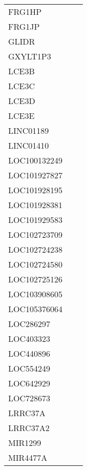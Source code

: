 \begin{tabular}{lcc}
FRG1HP             &           &         \\
FRG1JP             &           &         \\
GLIDR              &           &         \\
GXYLT1P3           &           &         \\
LCE3B              &           &         \\
LCE3C              &           &         \\
LCE3D              &           &         \\
LCE3E              &           &         \\
LINC01189          &           &         \\
LINC01410          &           &         \\
LOC100132249       &           &         \\
LOC101927827       &           &         \\
LOC101928195       &           &         \\
LOC101928381       &           &         \\
LOC101929583       &           &         \\
LOC102723709       &           &         \\
LOC102724238       &           &         \\
LOC102724580       &           &         \\
LOC102725126       &           &         \\
LOC103908605       &           &         \\
LOC105376064       &           &         \\
LOC286297          &           &         \\
LOC403323          &           &         \\
LOC440896          &           &         \\
LOC554249          &           &         \\
LOC642929          &           &         \\
LOC728673          &           &         \\
LRRC37A            &           &         \\
LRRC37A2           &           &         \\
MIR1299            &           &         \\
MIR4477A           &           &         \\

\end{tabular}
